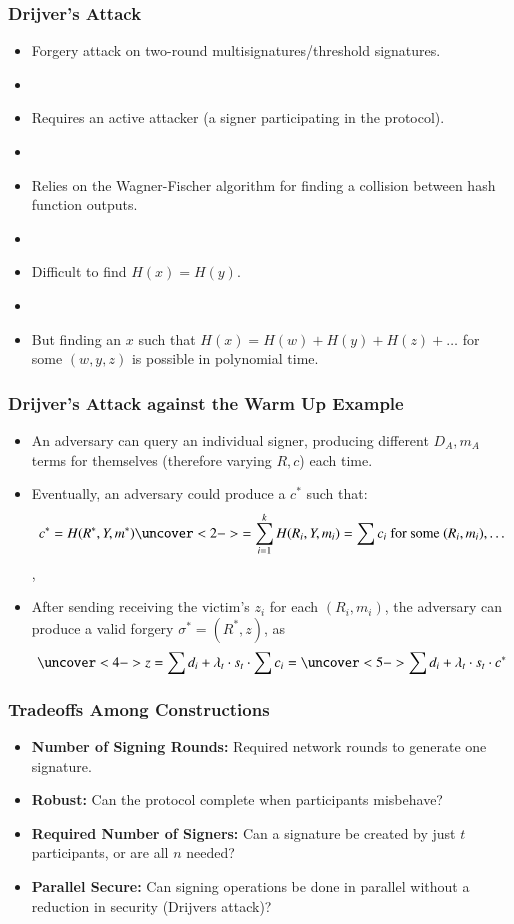 \documentclass[hyperref={pdfpagelabels=true},table,dvipsnames,14pt,aspectratio=169]{beamer}
\begin{document}
\begin{frame}
  \frametitle{Drijver's Attack}

  \begin{itemize}
    \item<1-> Forgery attack on two-round multisignatures/threshold signatures.
    \item[]
    \item<2-> Requires an active attacker (a signer participating in the protocol).
    \item[]
    \item<3-> Relies on the Wagner-Fischer algorithm for finding a collision between hash function outputs.
    \item[]
    \item<4-> Difficult to find $H(x) = H(y)$.
    \item[]
    \item<5-> But finding an $x$ such that $H(x) = H(w) + H(y) + H(z)+ \ldots$ for some $(w, y, z)$  is possible in
      polynomial time.
  \end{itemize}
\end{frame}

\begin{frame}
  \frametitle{Drijver's Attack against the Warm Up Example}
  \small

  \begin{itemize}
    \item<1->[] An adversary can query an individual signer, producing different
      $D_A, m_A$ terms for themselves (therefore varying $R, c$) each time.
    \item<2->[] Eventually, an adversary could produce a $c^*$ such that:
      \[ c^*= H(R^*, Y, m^*) \uncover<2->{ = \sum_{i=1}^{k} H(R_i, Y, m_i)  =
      \sum c_i  \text{ for some } (R_i, m_i), \dots } \],
    \item<3->[] After sending receiving the victim's $z_i$ for each $(R_i, m_i)$, the
  adversary can produce a valid forgery $\sigma^*=(R^*, z)$, as
      \[ \uncover<4-> {z = \sum d_i +  \lambda_t \cdot s_t \cdot \sum c_i} = \uncover<5->
      { \sum d_i + \lambda_t \cdot s_t \cdot c^*} \]
  \end{itemize}
\end{frame}


\begin{frame}
  \frametitle{Tradeoffs Among Constructions}

  \begin{itemize}
    \item<1-> \textbf{Number of Signing Rounds:} Required network rounds to
      generate one signature.
    \item<2-> \textbf{Robust:} Can the protocol complete when participants
      misbehave?
    \item<3-> \textbf{Required Number of Signers:} Can a signature be
    created by just $t$ participants, or are all $n$ needed?
    \item<4-> \textbf{Parallel Secure:} Can signing operations be done in
      parallel without a reduction in security (Drijvers attack)?
  \end{itemize}
\end{frame}
\end{document}
